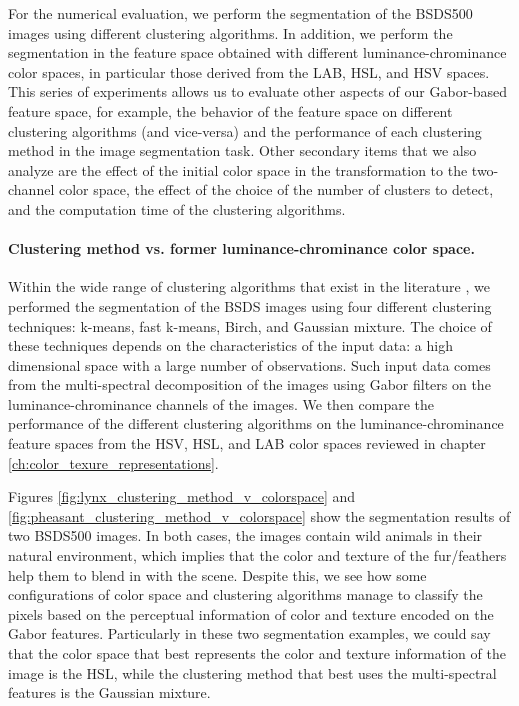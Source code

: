 For the numerical evaluation, we perform the segmentation of the BSDS500 images using different clustering algorithms. In addition, we perform the segmentation in the feature space obtained with different luminance-chrominance color spaces, in particular those derived from the LAB, HSL, and HSV spaces. This series of experiments allows us to evaluate other aspects of our Gabor-based feature space, for example, the behavior of the feature space on different clustering algorithms (and vice-versa) and the performance of each clustering method in the image segmentation task. Other secondary items that we also analyze are the effect of the initial color space in the transformation to the two-channel color space, the effect of the choice of the number of clusters to detect, and the computation time of the clustering algorithms. 

\paragraph{Clustering method vs. former luminance-chrominance color space.} 

Within the wide range of clustering algorithms that exist in the literature \citep{Omran.Engelbrecht.ea:IOS:2007} \citep{Sathya.Manavalan:IJCA:2011}, we performed the segmentation of the BSDS images using four different clustering techniques: k-means, fast k-means, Birch, and Gaussian mixture. The choice of these techniques depends on the characteristics of the input data: a high dimensional space with a large number of observations. Such input data comes from the multi-spectral decomposition of the images using Gabor filters on the luminance-chrominance channels of the images. We then compare the performance of the different clustering algorithms on the luminance-chrominance feature spaces from the HSV, HSL, and LAB color spaces reviewed in chapter \ref{ch:color_texure_representations}. 

Figures \ref{fig:lynx_clustering_method_v_colorspace} and \ref{fig:pheasant_clustering_method_v_colorspace} show the segmentation results of two BSDS500 images. In both cases, the images contain wild animals in their natural environment, which implies that the color and texture of the fur/feathers help them to blend in with the scene. Despite this, we see how some configurations of color space and clustering algorithms manage to classify the pixels based on the perceptual information of color and texture encoded on the Gabor features. Particularly in these two segmentation examples, we could say that the color space that best represents the color and texture information of the image is the HSL, while the clustering method that best uses the multi-spectral features is the Gaussian mixture. 

